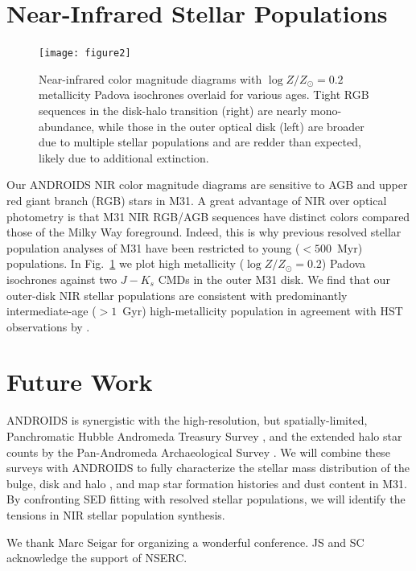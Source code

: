 \documentclass[11pt,twoside]{article}
\begin{document}
\section{Near-Infrared Stellar Populations}

\begin{figure}[t]
\centering
\texttt{[image: figure2]}
\caption{Near-infrared color magnitude diagrams with $\log Z/Z_\odot=0.2$ metallicity Padova isochrones overlaid for various ages.
Tight RGB sequences in the disk-halo transition (right) are nearly mono-abundance, while those in the outer optical disk (left) are broader due to multiple stellar populations and are redder than expected, likely due to additional extinction.}
\label{fig:cmd}
\end{figure}

Our ANDROIDS NIR color magnitude diagrams are sensitive to AGB and upper red giant branch (RGB) stars in M31.
A great advantage of NIR over optical photometry is that M31 NIR RGB/AGB sequences have distinct colors compared those of the Milky Way foreground.
Indeed, this is why previous resolved stellar population analyses of M31 \citep[e.g.,][]{Williams:2003} have been restricted to young ($<500$~Myr) populations.
In Fig.~\ref{fig:cmd} we plot high metallicity ($\log Z/Z_\odot = 0.2$) Padova isochrones \citep{Marigo:2008} against two $J-K_s$ CMDs in the outer M31 disk.
We find that our outer-disk NIR stellar populations are consistent with predominantly intermediate-age ($>1$~Gyr) high-metallicity population in agreement with HST observations by \cite{Brown:2006}.

\section{Future Work}

ANDROIDS is synergistic with the high-resolution, but spatially-limited, Panchromatic Hubble Andromeda Treasury Survey \citep{Dalcanton:2012}, and the extended halo star counts by the Pan-Andromeda Archaeological Survey \citep{McConnachie:2009}.
We will combine these surveys with ANDROIDS to fully characterize the stellar mass distribution of the bulge, disk and halo \citep[e.g.,][]{Courteau:2011}, and map star formation histories and dust content in M31.
By confronting SED fitting with resolved stellar populations, we will identify the tensions in NIR stellar population synthesis.

\acknowledgements We thank Marc Seigar for organizing a wonderful conference. JS and SC acknowledge the support of NSERC.


\end{document}

